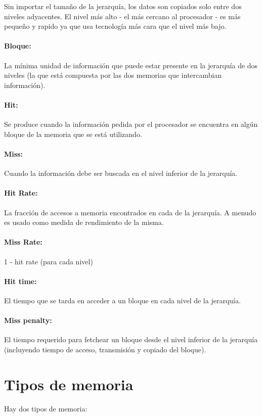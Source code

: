 Sin importar el tamaño de la jerarquía, los datos son copiados solo entre dos niveles adyacentes. El nivel más alto - el más cercano al procesador - es más pequeño y rapido ya que usa tecnología más cara que el nivel más bajo.

\paragraph{Bloque:} La mínima unidad de información que puede estar presente en la jerarquía de dos niveles (la que está compuesta por las dos memorias que intercambian información).

\paragraph{Hit:} Se produce cuando la información pedida por el procesador se encuentra en algún bloque de la memoria que se está utilizando.

\paragraph{Miss:} Cuando la información debe ser buscada en el nivel inferior de la jerarquía.

\paragraph{Hit Rate:} La fracción de accesos a memoria encontrados en cada de la jerarquía. A menudo es usado como medida de rendimiento de la misma.

\paragraph{Miss Rate: } 1 - hit rate (para cada nivel)

\paragraph{Hit time:} El tiempo que se tarda en acceder a un bloque en cada nivel de la jerarquía.

\paragraph{Miss penalty:} El tiempo requerido para fetchear un bloque desde el nivel inferior de la jerarquía (incluyendo tiempo de acceso, transmisión y copiado del bloque).

\section{Tipos de memoria}\label{sec::Memoria::Tipos}
Hay dos tipos de memoria:


